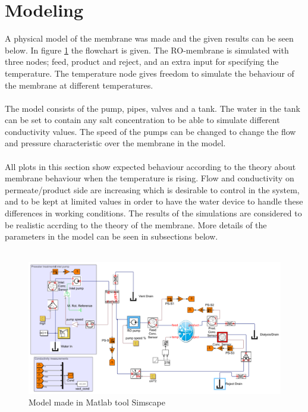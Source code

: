 \section{Modeling}
\label{sec:modres}
A physical model of the membrane was made and the given results can be seen below. In figure \ref{fig:simscape} the flowchart is given. The RO-membrane is simulated with three nodes; feed, product and reject, and an extra input for specifying the temperature. The temperature node gives freedom to simulate the behaviour of the membrane at different temperatures. \\
\\
The model consists of the pump, pipes, valves and a tank. The water in the tank can be set to contain any salt concentration to be able to simulate different conductivity values. The speed of the pumps can be changed to change the flow and pressure characteristic over the membrane in the model. \\
\\
All plots in this section show expected behaviour according to the theory about membrane behaviour when the temperature is rising. Flow and conductivity on permeate/product side are increasing which is desirable to control in the system, and to be kept at limited values in order to have the water device to handle these differences in working conditions. The results of the simulations are considered to be realistic accrding to the theory of the membrane. More details of the parameters in the model can be  seen in subsections below.\\
\\
\begin{figure}[h]
\label{fig:simscape}
\centering
\includegraphics[width=\textwidth]{simscape_fc1.PNG}
\caption{Model made in Matlab tool Simscape }
\end{figure}
\newpage


